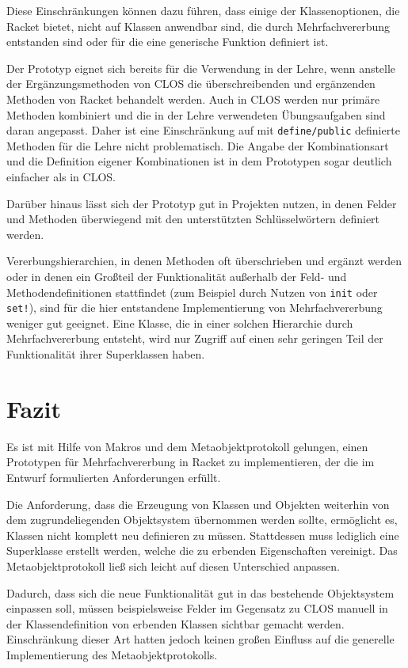 Diese Einschränkungen können dazu führen, dass einige der Klassenoptionen, die Racket bietet, nicht auf Klassen anwendbar sind, die durch Mehrfachvererbung entstanden sind oder für die eine generische Funktion definiert ist.

Der Prototyp eignet sich bereits für die Verwendung in der Lehre, wenn anstelle der Ergänzungsmethoden von CLOS die überschreibenden und ergänzenden Methoden von Racket behandelt werden. Auch in CLOS werden nur primäre Methoden kombiniert und die in der Lehre verwendeten Übungsaufgaben sind daran angepasst. Daher ist eine Einschränkung auf mit \texttt{define/public} definierte Methoden für die Lehre nicht problematisch. Die Angabe der Kombinationsart und die Definition eigener Kombinationen ist in dem Prototypen sogar deutlich einfacher als in CLOS.

Darüber hinaus lässt sich der Prototyp gut in Projekten nutzen, in denen Felder und Methoden überwiegend mit den unterstützten Schlüsselwörtern definiert werden. 

Vererbungshierarchien, in denen Methoden oft überschrieben und ergänzt werden oder in denen ein Großteil der Funktionalität außerhalb der Feld- und Methodendefinitionen stattfindet (zum Beispiel durch Nutzen von \texttt{init} oder \texttt{set!}), sind für die hier entstandene Implementierung von Mehrfachvererbung weniger gut geeignet. Eine Klasse, die in einer solchen Hierarchie durch Mehrfachvererbung entsteht, wird nur Zugriff auf einen sehr geringen Teil der Funktionalität ihrer Superklassen haben.

\section{Fazit}
Es ist mit Hilfe von Makros und dem Metaobjektprotokoll gelungen, einen Prototypen für Mehrfachvererbung in Racket zu implementieren, der die im Entwurf formulierten Anforderungen erfüllt.

Die Anforderung, dass die Erzeugung von Klassen und Objekten weiterhin von dem zugrundeliegenden Objektsystem übernommen werden sollte, ermöglicht es, Klassen nicht komplett neu definieren zu müssen. Stattdessen muss lediglich eine Superklasse erstellt werden, welche die zu erbenden Eigenschaften vereinigt. Das Metaobjektprotokoll ließ sich leicht auf diesen Unterschied anpassen.

Dadurch, dass sich die neue Funktionalität gut in das bestehende Objektsystem einpassen soll, müssen beispielsweise Felder im Gegensatz zu CLOS manuell in der Klassendefinition von erbenden Klassen sichtbar gemacht werden. Einschränkung dieser Art hatten jedoch keinen großen Einfluss auf die generelle Implementierung des Metaobjektprotokolls.

